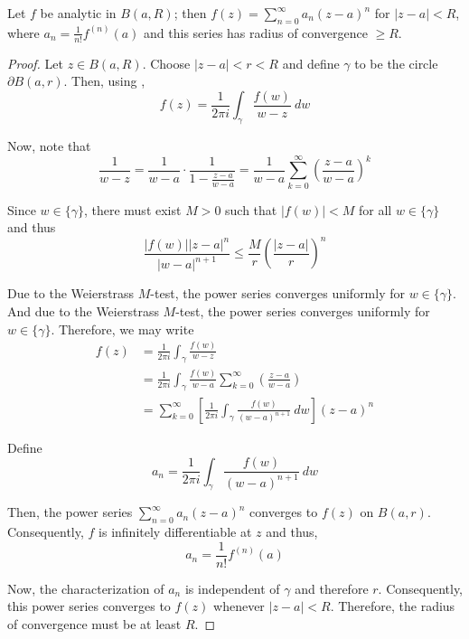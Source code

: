 \begin{theorem}
    Let $f$ be analytic in $B(a,R)$; then $f(z) = \sum\limits_{n = 0}^\infty a_n(z - a)^n$ for $|z - a| < R$, where $a_n = \frac{1}{n!}f^{(n)}(a)$ and this series has radius of convergence $\ge R$.
\end{theorem}
\begin{proof}
    Let $z\in B(a,R)$. Choose $|z - a| < r < R$ and define $\gamma$ to be the circle $\partial B(a,r)$. Then, using , 
    \begin{equation*}
        f(z) = \frac{1}{2\pi i}\int_\gamma \frac{f(w)}{w - z}~dw
    \end{equation*}

    Now, note that
    \begin{equation*}
        \frac{1}{w - z} = \frac{1}{w - a}\cdot\frac{1}{1 - \frac{z - a}{w - a}} = \frac{1}{w - a}\sum_{k = 0}^\infty\left(\frac{z - a}{w - a}\right)^k
    \end{equation*}

    Since $w\in\{\gamma\}$, there must exist $M > 0$ such that $|f(w)| < M$ for all $w\in\{\gamma\}$ and thus 
    \begin{equation*}
        \frac{|f(w)||z - a|^n}{|w - a|^{n + 1}}\le\frac{M}{r}\left(\frac{|z - a|}{r}\right)^{n}
    \end{equation*}

    Due to the Weierstrass $M$-test, the power series converges uniformly for $w\in\{\gamma\}$.
    And due to the Weierstrass $M$-test, the power series converges uniformly for $w\in\{\gamma\}$. Therefore, we may write 
    \begin{align*}
        f(z) &= \frac{1}{2\pi i}\int_\gamma\frac{f(w)}{w - z}\\
        &= \frac{1}{2\pi i}\int_\gamma \frac{f(w)}{w - a}\sum_{k = 0}^\infty\left(\frac{z - a}{w - a}\right)\\
        &= \sum_{k=0}^\infty\left[\frac{1}{2\pi i}\int_\gamma\frac{f(w)}{(w - a)^{n + 1}}~dw\right](z - a)^n
    \end{align*}

    Define 
    \begin{equation*}
        a_n = \frac{1}{2\pi i}\int_\gamma\frac{f(w)}{(w - a)^{n + 1}}~dw
    \end{equation*}

    Then, the power series $\sum_{n = 0}^\infty a_n(z - a)^n$ converges to $f(z)$ on $B(a,r)$. Consequently, $f$ is infinitely differentiable at $z$ and thus, 
    \begin{equation*}
        a_n = \frac{1}{n!}f^{(n)}(a)
    \end{equation*}

    Now, the characterization of $a_n$ is independent of $\gamma$ and therefore $r$. Consequently, this power series converges to $f(z)$ whenever $|z - a| < R$. Therefore, the radius of convergence must be at least $R$.
\end{proof}

